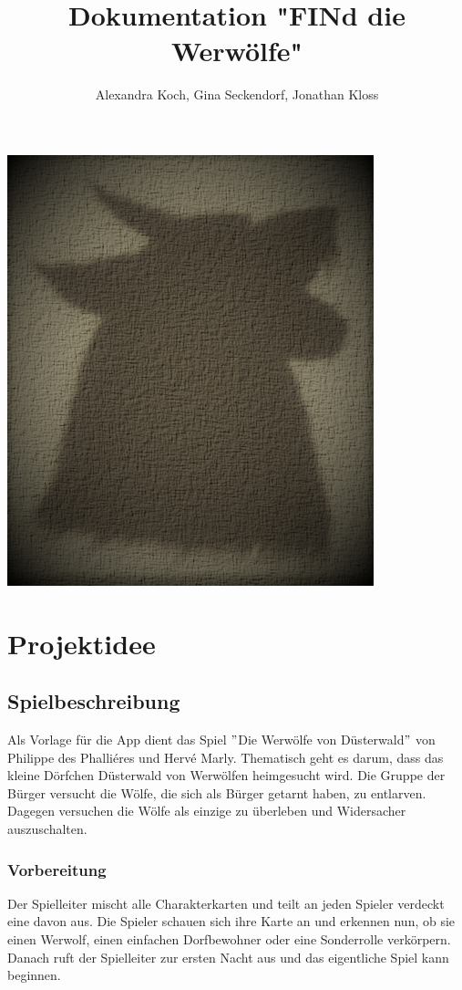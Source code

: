 \documentclass[12pt]{article}
\title{Dokumentation "FINd die Werwölfe"}
\author{Alexandra Koch, Gina Seckendorf, Jonathan Kloss}
\begin{document}
\maketitle
\begin{center} \includegraphics{wolf} \end{center}
\tableofcontents
\setcounter{tocdepth}{3}

\newpage

\section{Projektidee}

\subsection{Spielbeschreibung}
Als Vorlage für die App dient das Spiel $"$Die Werwölfe von Düsterwald$"$ von Philippe des Phalliéres und Hervé Marly. Thematisch geht es darum, dass das kleine Dörfchen Düsterwald von Werwölfen heimgesucht wird. Die Gruppe der Bürger versucht die Wölfe, die sich als Bürger getarnt haben, zu entlarven. Dagegen versuchen die Wölfe als einzige zu überleben und Widersacher auszuschalten.

\subsubsection{Vorbereitung}
Der Spielleiter mischt alle Charakterkarten und teilt an jeden Spieler verdeckt eine davon aus. Die Spieler schauen sich ihre Karte an und erkennen nun, ob sie einen Werwolf, einen einfachen Dorfbewohner oder eine Sonderrolle verkörpern. Danach ruft der Spielleiter zur ersten Nacht aus und das eigentliche Spiel kann beginnen.
\end{document}
